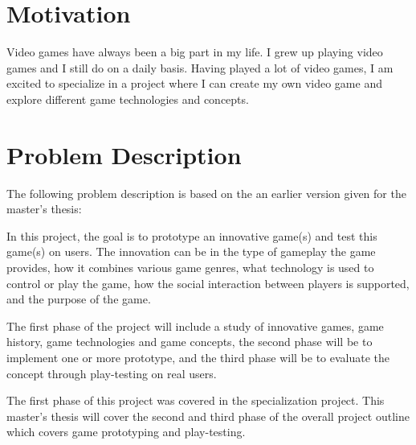 \section{Motivation}
Video games have always been a big part in my life. I grew up playing video games and I still do on a daily basis. Having played a lot of video games, I am excited to specialize in a project where I can create my own video game and explore different game technologies and concepts.



\section{Problem Description}
The following problem description is based on the an earlier version given for the master's thesis:

\begin{displayquote}
	In this project, the goal is to prototype an innovative game(s) and test this game(s) on users. The innovation can be in the type of gameplay the game provides, how it combines various game genres, what technology is used to control or play the game, how the social interaction between players is supported, and the purpose of the game.
	
	The first phase of the project will include a study of innovative games, game history, game technologies and game concepts, the second phase will be to implement one or more prototype, and the third phase will be to evaluate the concept through play-testing on real users.
\end{displayquote}

The first phase of this project was covered in the specialization project. This master's thesis will cover the second and third phase of the overall project outline which covers game prototyping and play-testing.


